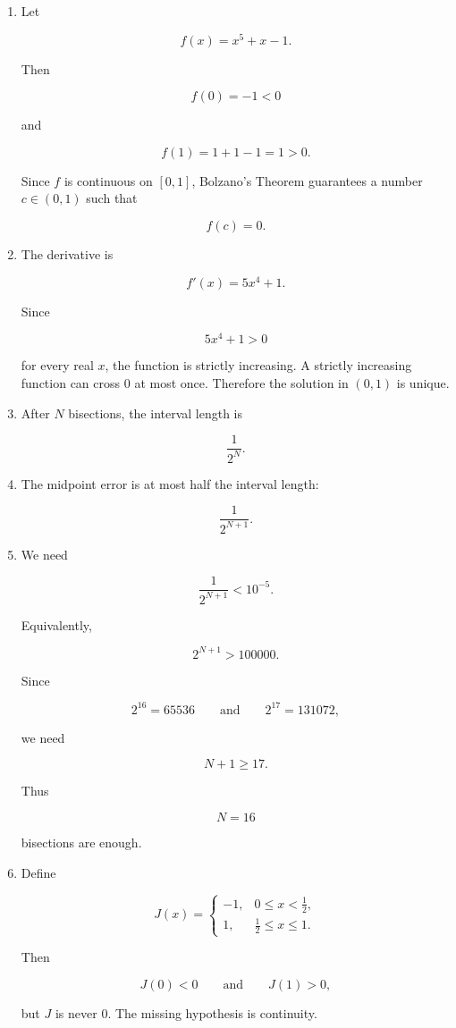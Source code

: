 \begin{enumerate}
\item
Let

\[
f(x)=x^5+x-1.
\]

Then

\[
f(0)=-1<0
\]

and

\[
f(1)=1+1-1=1>0.
\]

Since \(f\) is continuous on \([0,1]\), Bolzano's Theorem guarantees a number
\(c\in(0,1)\) such that

\[
f(c)=0.
\]

\item
The derivative is

\[
f'(x)=5x^4+1.
\]

Since

\[
5x^4+1>0
\]

for every real \(x\), the function is strictly increasing.  A strictly increasing function
can cross \(0\) at most once.  Therefore the solution in \((0,1)\) is unique.

\item
After \(N\) bisections, the interval length is

\[
\boxed{
\frac1{2^N}.
}
\]

\item
The midpoint error is at most half the interval length:

\[
\boxed{
\frac1{2^{N+1}}.
}
\]

\item
We need

\[
\frac1{2^{N+1}}<10^{-5}.
\]

Equivalently,

\[
2^{N+1}>100000.
\]

Since

\[
2^{16}=65536
\qquad\text{and}\qquad
2^{17}=131072,
\]

we need

\[
N+1\ge17.
\]

Thus

\[
\boxed{N=16}
\]

bisections are enough.

\item
Define

\[
J(x)=
\begin{cases}
-1, & 0\le x<\frac12,\\
1, & \frac12\le x\le1.
\end{cases}
\]

Then

\[
J(0)<0
\qquad\text{and}\qquad
J(1)>0,
\]

but \(J\) is never \(0\).  The missing hypothesis is continuity.
\end{enumerate}

